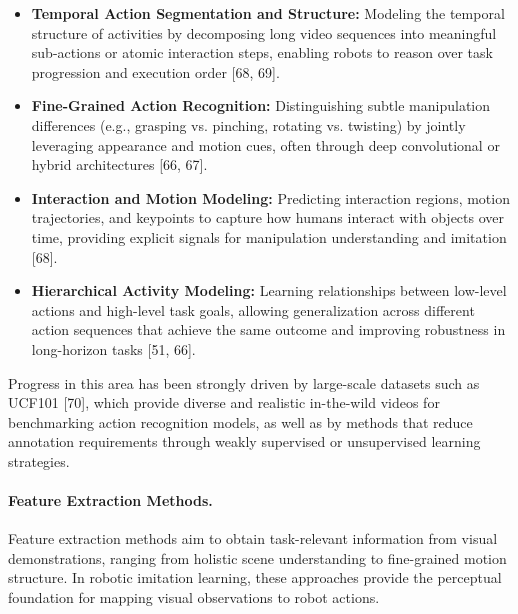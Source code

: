 \begin{itemize}
    \item \textbf{Temporal Action Segmentation and Structure:} Modeling the temporal structure of activities by decomposing long video sequences into meaningful sub-actions or atomic interaction steps, enabling robots to reason over task progression and execution order [68, 69].

    \item \textbf{Fine-Grained Action Recognition:} Distinguishing subtle manipulation differences (e.g., grasping vs. pinching, rotating vs. twisting) by jointly leveraging appearance and motion cues, often through deep convolutional or hybrid architectures [66, 67].

    \item \textbf{Interaction and Motion Modeling:} Predicting interaction regions, motion trajectories, and keypoints to capture how humans interact with objects over time, providing explicit signals for manipulation understanding and imitation [68].

    \item \textbf{Hierarchical Activity Modeling:} Learning relationships between low-level actions and high-level task goals, allowing generalization across different action sequences that achieve the same outcome and improving robustness in long-horizon tasks [51, 66].
\end{itemize}

Progress in this area has been strongly driven by large-scale datasets such as UCF101 [70], which provide diverse and realistic in-the-wild videos for benchmarking action recognition models, as well as by methods that reduce annotation requirements through weakly supervised or unsupervised learning strategies.












\paragraph{Feature Extraction Methods.}
Feature extraction methods aim to obtain task-relevant information from visual demonstrations, ranging from holistic scene understanding to fine-grained motion structure. In robotic imitation learning, these approaches provide the perceptual foundation for mapping visual observations to robot actions.

